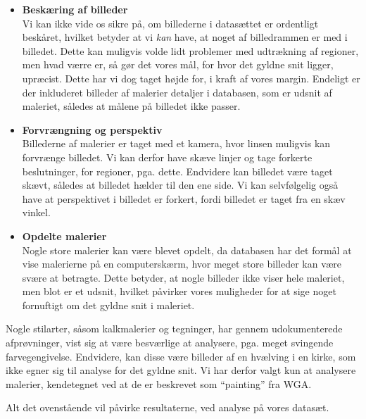 {\begin{itemize}
    \item \textbf{Beskæring af billeder}\\
        Vi kan ikke vide os sikre på, om billederne i datasættet er
        ordentligt beskåret, hvilket betyder at vi \emph{kan} have, at
        noget af billedrammen er med i billedet. Dette kan muligvis
        volde lidt problemer med udtrækning af regioner, men hvad værre
        er, så gør det vores mål, for hvor det gyldne snit ligger,
        upræcist. Dette har vi dog taget højde for, i kraft af vores
        margin.  Endeligt er der inkluderet billeder af malerier
        detaljer i databasen, som er udsnit af maleriet, således at
        målene på billedet ikke passer.
    \item \textbf{Forvrængning og perspektiv}\\
        Billederne af malerier er taget med et kamera, hvor linsen muligvis kan
        forvrænge billedet. Vi kan derfor have skæve linjer og tage
        forkerte beslutninger, for regioner, pga. dette. Endvidere kan
        billedet være taget skævt, således at billedet hælder til den
        ene side. Vi kan selvfølgelig også have at perspektivet i
        billedet er forkert, fordi billedet er taget fra en skæv vinkel.
    \item \textbf{Opdelte malerier}\\
        Nogle store malerier kan være blevet opdelt, da databasen har
        det formål at vise malerierne på en computerskærm, hvor meget
        store billeder kan være svære at betragte. Dette betyder, at
        nogle billeder ikke viser hele maleriet, men blot er et udsnit,
        hvilket påvirker vores muligheder for at sige noget fornuftigt
        om det gyldne snit i maleriet.
\end{itemize}

Nogle stilarter, såsom kalkmalerier og tegninger, har gennem
udokumenterede afprøvninger, vist sig at være besværlige at analysere,
pga. meget svingende farvegengivelse. Endvidere, kan disse være billeder
af en hvælving i en kirke, som ikke egner sig til analyse for det gyldne
snit. Vi har derfor valgt kun at analysere malerier, kendetegnet ved at
de er beskrevet som ``painting'' fra WGA.

Alt det ovenstående vil påvirke resultaterne, ved analyse på vores
datasæt.

}
